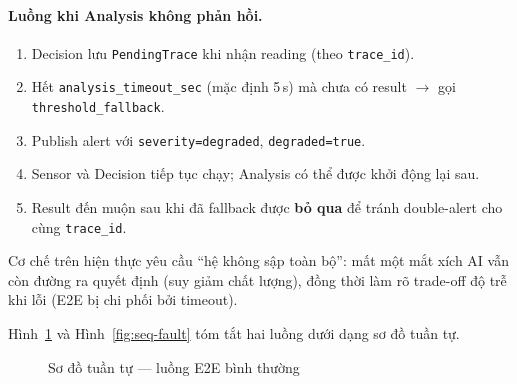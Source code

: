 \documentclass[12pt,a4paper,oneside]{report}
\newcommand{\code}[1]{\texttt{#1}}
\begin{document}
\paragraph{Luồng khi Analysis không phản hồi.}
\begin{enumerate}
  \item Decision lưu \code{PendingTrace} khi nhận reading (theo \code{trace\_id}).
  \item Hết \code{analysis\_timeout\_sec} (mặc định 5\,s) mà chưa có result $\rightarrow$ gọi \code{threshold\_fallback}.
  \item Publish alert với \code{severity=degraded}, \code{degraded=true}.
  \item Sensor và Decision tiếp tục chạy; Analysis có thể được khởi động lại sau.
  \item Result đến muộn sau khi đã fallback được \textbf{bỏ qua} để tránh double-alert cho cùng \code{trace\_id}.
\end{enumerate}

Cơ chế trên hiện thực yêu cầu ``hệ không sập toàn bộ'': mất một mắt xích AI vẫn còn đường ra quyết định (suy giảm chất lượng), đồng thời làm rõ trade-off độ trễ khi lỗi (E2E bị chi phối bởi timeout).

Hình~\ref{fig:seq-normal} và Hình~\ref{fig:seq-fault} tóm tắt hai luồng dưới dạng sơ đồ tuần tự.

\begin{figure}[htbp]
  \centering
  \caption{Sơ đồ tuần tự --- luồng E2E bình thường}
  \label{fig:seq-normal}
\end{figure}
\end{document}
